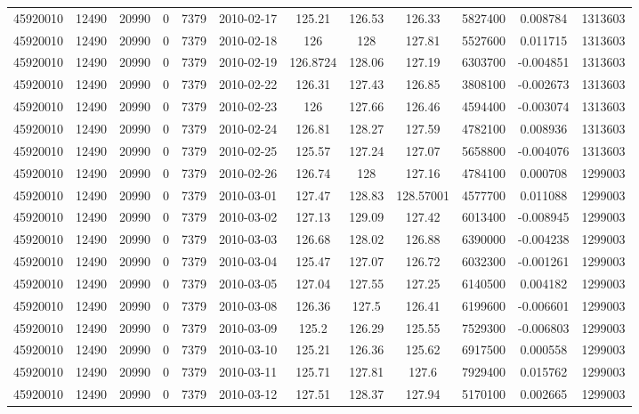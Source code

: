 \documentclass[12 pt]{article}
\begin{document}
\begin{flushleft}
\begin{table}[h]
\begin{tabular}{c c c c c c c c c c c c }
45920010 & 12490 & 20990 & 0 & 7379 & 2010-02-17 & 125.21 & 126.53 & 126.33 & 5827400 & 0.008784 & 1313603\\
45920010 & 12490 & 20990 & 0 & 7379 & 2010-02-18 & 126 & 128 & 127.81 & 5527600 & 0.011715 & 1313603\\
45920010 & 12490 & 20990 & 0 & 7379 & 2010-02-19 & 126.8724 & 128.06 & 127.19 & 6303700 & -0.004851 & 1313603\\
45920010 & 12490 & 20990 & 0 & 7379 & 2010-02-22 & 126.31 & 127.43 & 126.85 & 3808100 & -0.002673 & 1313603\\
45920010 & 12490 & 20990 & 0 & 7379 & 2010-02-23 & 126 & 127.66 & 126.46 & 4594400 & -0.003074 & 1313603\\
45920010 & 12490 & 20990 & 0 & 7379 & 2010-02-24 & 126.81 & 128.27 & 127.59 & 4782100 & 0.008936 & 1313603\\
45920010 & 12490 & 20990 & 0 & 7379 & 2010-02-25 & 125.57 & 127.24 & 127.07 & 5658800 & -0.004076 & 1313603\\
45920010 & 12490 & 20990 & 0 & 7379 & 2010-02-26 & 126.74 & 128 & 127.16 & 4784100 & 0.000708 & 1299003\\
45920010 & 12490 & 20990 & 0 & 7379 & 2010-03-01 & 127.47 & 128.83 & 128.57001 & 4577700 & 0.011088 & 1299003\\
45920010 & 12490 & 20990 & 0 & 7379 & 2010-03-02 & 127.13 & 129.09 & 127.42 & 6013400 & -0.008945 & 1299003\\
45920010 & 12490 & 20990 & 0 & 7379 & 2010-03-03 & 126.68 & 128.02 & 126.88 & 6390000 & -0.004238 & 1299003\\
45920010 & 12490 & 20990 & 0 & 7379 & 2010-03-04 & 125.47 & 127.07 & 126.72 & 6032300 & -0.001261 & 1299003\\
45920010 & 12490 & 20990 & 0 & 7379 & 2010-03-05 & 127.04 & 127.55 & 127.25 & 6140500 & 0.004182 & 1299003\\
45920010 & 12490 & 20990 & 0 & 7379 & 2010-03-08 & 126.36 & 127.5 & 126.41 & 6199600 & -0.006601 & 1299003\\
45920010 & 12490 & 20990 & 0 & 7379 & 2010-03-09 & 125.2 & 126.29 & 125.55 & 7529300 & -0.006803 & 1299003\\
45920010 & 12490 & 20990 & 0 & 7379 & 2010-03-10 & 125.21 & 126.36 & 125.62 & 6917500 & 0.000558 & 1299003\\
45920010 & 12490 & 20990 & 0 & 7379 & 2010-03-11 & 125.71 & 127.81 & 127.6 & 7929400 & 0.015762 & 1299003\\
45920010 & 12490 & 20990 & 0 & 7379 & 2010-03-12 & 127.51 & 128.37 & 127.94 & 5170100 & 0.002665 & 1299003\\

\end{tabular}
\end{table}
\end{flushleft}
\end{document}
